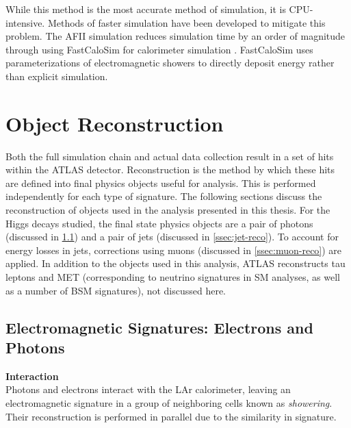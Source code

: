 While this method is the most accurate method of simulation, it is CPU-intensive. Methods of faster simulation have been developed to mitigate this problem. The \gls{AFII} simulation reduces simulation time by an order of magnitude through using FastCaloSim for calorimeter simulation \cite{fastcalosim}. FastCaloSim uses parameterizations of electromagnetic showers to directly deposit energy rather than explicit simulation.


\section{Object Reconstruction} \label{sec:reconstruction}

Both the full simulation chain and actual data collection result in a set of hits within the ATLAS detector. Reconstruction is the method by which these hits are defined into final physics objects useful for analysis. This is performed independently for each type of signature. The following sections discuss the reconstruction of objects used in the analysis presented in this thesis. For the Higgs decays studied, the final state physics objects are a pair of photons (discussed in \ref{ssec:em-signatures}) and a pair of jets (discussed in \ref{ssec:jet-reco}). To account for energy losses in jets, corrections using muons (discussed in \ref{ssec:muon-reco}) are applied. In addition to the objects used in this analysis, ATLAS reconstructs tau leptons and \gls{MET} (corresponding to neutrino signatures in \gls{SM} analyses, as well as a number of \gls{BSM} signatures), not discussed here.

\subsection{Electromagnetic Signatures: Electrons and Photons} \label{ssec:em-signatures} %

\noindent\textbf{Interaction}\\
\indent Photons and electrons interact with the \gls{LAr} calorimeter, leaving an electromagnetic signature in a group of neighboring cells known as \textit{showering}. Their reconstruction is performed in parallel due to the similarity in signature.

